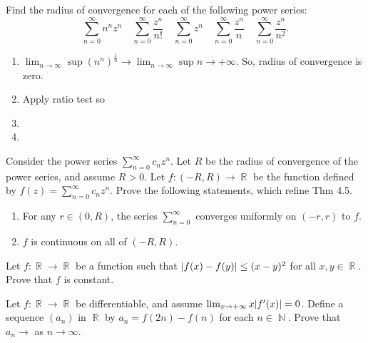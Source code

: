 \documentclass[12pt,letterpaper,boxed]{hmcpset}
\DeclareMathOperator{\N}{\mathbb{N}}
\DeclareMathOperator{\R}{\mathbb{R}}
\DeclarePairedDelimiter\abs{\lvert}{\rvert}%
\begin{document}
\begin{problem}[Exercise 4.6]
Find the radius of convergence for each of the following power series: $$
\sum_{n=0}^{\infty} n^{n} z^{n} \quad \sum_{n=0}^{\infty} \frac{z^{n}}{n !} \quad \sum_{n=0}^{\infty} z^{n} \quad \sum_{n=0}^{\infty} \frac{z^{n}}{n} \quad \sum_{n=0}^{\infty} \frac{z^{n}}{n^{2}}
.$$
\end{problem}

\begin{solution}
\begin{enumerate}
    \item $\lim_{n \rightarrow \infty}\sup (n^{n})^{\frac{1}{n}} \rightarrow \lim_{n \rightarrow \infty}\sup n\rightarrow +\infty$. So, radius of convergence is zero.
    \item Apply ratio test so
    \item 
    \item 
\end{enumerate}
\end{solution}


\begin{problem}[Exercise 4.7]
Consider the power series $\sum_{n=0}^{\infty} c_nz^{n}$. Let $R$ be the radius of convergence of the power series, and assume $R>0$. Let $f: (-R,R) \rightarrow \R$ be the function defined by $f(z)=\sum_{n=0}^{\infty} c_nz^{n}$. Prove the following statements, which refine Thm 4.5.
\begin{enumerate}
    \item For any $r \in (0, R)$, the series $\sum_{n=0}^{\infty}$ converges uniformly on $(-r, r)$ to $f$.
    \item $f$ is continuous on all of $(-R,R)$.
\end{enumerate}
\end{problem}


\begin{solution}
\end{solution}


\begin{problem}[Exercise 1.5]
Let $f: \R \rightarrow \R$ be a function such that $\abs{f(x) - f(y)} \leq (x - y)^{2}$ for all $x, y \in \R.$ Prove that $f$ is constant.
\end{problem}

\begin{solution}

\end{solution}

\begin{problem}[Exercise 1.11]
Let $f: \R \rightarrow \R$ be differentiable, and assume $\lim_{x \rightarrow +\infty}x\abs{f'(x)}=0$. Define a sequence $(a_n)$ in $\R$ by $a_n = f(2n) -f(n)$ for each $n \in \N$. Prove that $a_n \rightarrow$ as $n\rightarrow\infty$.
\end{problem}
\end{document}
